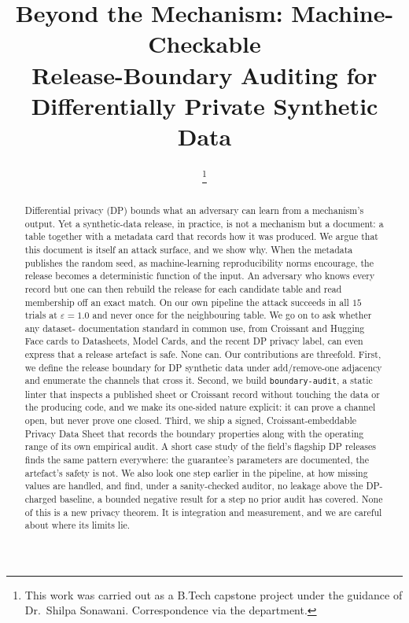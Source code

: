 \documentclass[conference]{IEEEtran}
\newcommand{\eps}{\varepsilon}
\newcommand{\code}[1]{\texttt{\small #1}}
\begin{document}
\title{Beyond the Mechanism: Machine-Checkable\\ Release-Boundary Auditing for\\ Differentially Private Synthetic Data}

\author{
\thanks{This work was carried out as a B.Tech capstone project under the guidance of
Dr.~Shilpa Sonawani. Correspondence via the department.}
}

\maketitle

\begin{abstract}
Differential privacy (DP) bounds what an adversary can learn from a mechanism's output. Yet a
synthetic-data release, in practice, is not a mechanism but a document: a table together with a
metadata card that records how it was produced. We argue that this document is itself an attack
surface, and we show why. When the metadata publishes the random seed, as machine-learning
reproducibility norms encourage, the release becomes a deterministic function of the input. An
adversary who knows every record but one can then rebuild the release for each candidate table and
read membership off an exact match. On our own pipeline the attack succeeds in all $15$ trials at
$\eps{=}1.0$ and never once for the neighbouring table. We go on to ask whether any dataset-
documentation standard in common use, from Croissant and Hugging Face cards to Datasheets, Model
Cards, and the recent DP privacy label, can even express that a release artefact is safe. None can.
Our contributions are threefold. First, we define the release boundary for DP synthetic data under
add/remove-one adjacency and enumerate the channels that cross it. Second, we build
\code{boundary-audit}, a static linter that inspects a published sheet or Croissant record without
touching the data or the producing code, and we make its one-sided nature explicit: it can prove a
channel open, but never prove one closed. Third, we ship a signed, Croissant-embeddable Privacy Data
Sheet that records the boundary properties along with the operating range of its own empirical audit.
A short case study of the field's flagship DP releases finds the same pattern everywhere: the
guarantee's parameters are documented, the artefact's safety is not. We also look one step earlier in
the pipeline, at how missing values are handled, and find, under a sanity-checked auditor, no leakage
above the DP-charged baseline, a bounded negative result for a step no prior audit has covered. None
of this is a new privacy theorem. It is integration and measurement, and we are careful about where
its limits lie.
\end{abstract}
\end{document}
